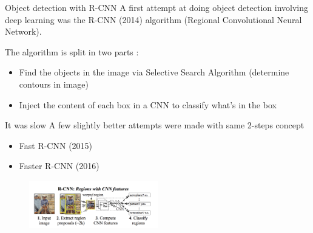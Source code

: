 \documentclass[tikz,table,border=2mm]{beamer}
\begin{document}
\begin{frame}{Object detection with R-CNN}
A first attempt at doing object detection involving deep learning was the R-CNN (2014) algorithm (Regional Convolutional Neural Network).\newline


The algorithm is split in two parts :
\begin{itemize}
  \item Find the objects in the image via Selective Search Algorithm (determine contours in image)
  \item Inject the content of each box in a CNN to classify what's in the box
\end{itemize}
\begin{alertblock}{It was slow}
 A few slightly better attempts were made with same 2-steps concept
\begin{itemize}
\item Fast R-CNN  (2015)
\item Faster R-CNN (2016)
\end{itemize}
\end{alertblock}
\begin{figure}[ht]
    \centering
    \includegraphics[width=0.5\textwidth]{images/r-cnn.png}
\end{figure}
\end{frame}
\end{document}
